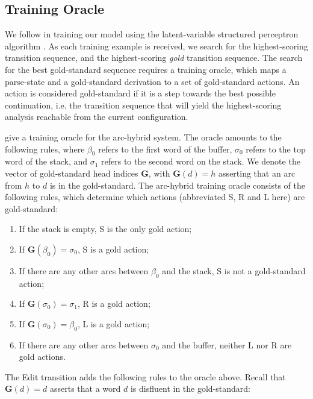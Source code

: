 \documentclass[11pt,letterpaper]{article}
\begin{document}
\subsection{Training Oracle}

We follow \citet{honnibal:14} in training our model using the latent-variable
structured perceptron algorithm \citep{sun:09}.  As each training example is
received, we search for the highest-scoring transition sequence, and the highest-scoring
\emph{gold} transition sequence.  The search for the best gold-standard sequence
requires a training oracle, which maps a parse-state and a gold-standard derivation
to a set of gold-standard actions.  An action is considered gold-standard if
it is a step towards the best possible continuation, i.e. the
transition sequence that will yield the highest-scoring analysis reachable from
the current configuration.

\citet{goldberg:13} give a training oracle for the arc-hybrid system.  The oracle
amounts to the following rules, where $\beta_0$ refers to the first word of the
buffer, $\sigma_0$ refers to the top word of the stack, and $\sigma_1$ refers
to the second word on the stack.  We denote the vector of gold-standard
head indices $\mathbf{G}$, with
$\mathbf{G}(d)=h$ asserting that an arc from $h$
to $d$ is in the gold-standard.  The arc-hybrid training oracle consists of
the following rules, which determine which actions (abbreviated S, R and L here)
are gold-standard:

\begin{enumerate}
    \item If the stack is empty, S is the only gold action;
    \item If $\mathbf{G}(\beta_0)=\sigma_0$, S is a gold action; 
    \item If there are any other arcs between $\beta_0$ and the stack, S is 
          not a gold-standard action;
      \item If $\mathbf{G}(\sigma_0)=\sigma_1$, R is a gold action;
      \item If $\mathbf{G}(\sigma_0)=\beta_0$, L is a gold action;
    \item If there are any other arcs between $\sigma_0$ and the buffer, neither
          L nor R are gold actions.
\end{enumerate}

\noindent The \citet{honnibal:14} Edit transition adds the following rules to the oracle
above. Recall that $\mathbf{G}(d)=d$ asserts that a word $d$ is disfluent in the
gold-standard:
\end{document}
